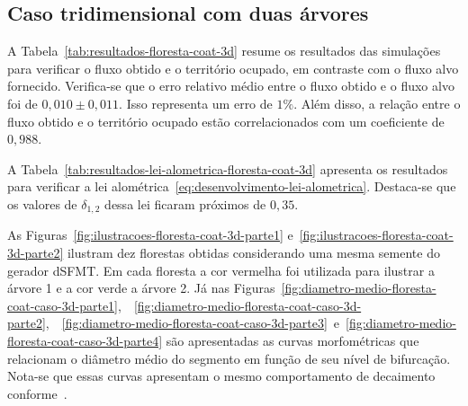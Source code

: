 \subsection{Caso tridimensional com duas árvores}\label{sec:coat-floresta-caso-3d}

A Tabela~\ref{tab:resultados-floresta-coat-3d} resume os resultados
das simulações para verificar o fluxo obtido e o território ocupado, em contraste com o 
fluxo alvo fornecido.
Verifica-se que o erro relativo médio entre o fluxo obtido e o fluxo alvo foi 
de $0,010 \pm 0,011$. Isso representa um erro de $1\%$. 
Além disso, a relação entre o fluxo obtido e o território ocupado estão correlacionados com um
coeficiente de $0,988$.

A Tabela~\ref{tab:resultados-lei-alometrica-floresta-coat-3d} apresenta os resultados 
para verificar a lei alométrica~\eqref{eq:desenvolvimento-lei-alometrica}. Destaca-se que os valores
de $\delta_{1, 2}$ dessa lei ficaram próximos de $0,35$.

As Figuras~\ref{fig:ilustracoes-floresta-coat-3d-parte1} e~\ref{fig:ilustracoes-floresta-coat-3d-parte2} ilustram 
dez florestas obtidas considerando uma mesma semente do gerador dSFMT. Em cada floresta a cor vermelha foi utilizada 
para ilustrar a árvore 1 e a cor verde a árvore 2.
Já nas Figuras~\ref{fig:diametro-medio-floresta-coat-caso-3d-parte1},\ 
~\ref{fig:diametro-medio-floresta-coat-caso-3d-parte2},\ 
~\ref{fig:diametro-medio-floresta-coat-caso-3d-parte3}\ 
e~\ref{fig:diametro-medio-floresta-coat-caso-3d-parte4} são apresentadas 
as curvas morfométricas que relacionam o diâmetro médio 
do segmento em função de seu nível de bifurcação. Nota-se que essas curvas apresentam
o mesmo comportamento de decaimento conforme~\cite{Karch1999}.

